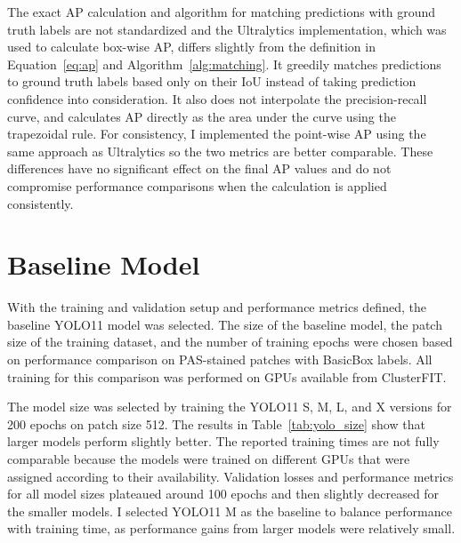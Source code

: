 The exact AP calculation and algorithm for matching predictions with ground truth labels are not standardized and the Ultralytics implementation, which was used to calculate box-wise AP, differs slightly from the definition in Equation~\ref{eq:ap} and Algorithm~\ref{alg:matching}. It greedily matches predictions to ground truth labels based only on their IoU instead of taking prediction confidence into consideration. It also does not interpolate the precision-recall curve, and calculates AP directly as the area under the curve using the trapezoidal rule. For consistency, I implemented the point-wise AP using the same approach as Ultralytics so the two metrics are better comparable. These differences have no significant effect on the final AP values and do not compromise performance comparisons when the calculation is applied consistently.


\section{Baseline Model}
With the training and validation setup and performance metrics defined, the baseline YOLO11 model was selected. The size of the baseline model, the patch size of the training dataset, and the number of training epochs were chosen based on performance comparison on PAS-stained patches with BasicBox labels. All training for this comparison was performed on GPUs available from ClusterFIT.

The model size was selected by training the YOLO11 S, M, L, and X versions for 200 epochs on patch size 512. The results in Table~\ref{tab:yolo_size} show that larger models perform slightly better. The reported training times are not fully comparable because the models were trained on different GPUs that were assigned according to their availability. Validation losses and performance metrics for all model sizes plateaued around 100 epochs and then slightly decreased for the smaller models. I selected YOLO11 M as the baseline to balance performance with training time, as performance gains from larger models were relatively small.


